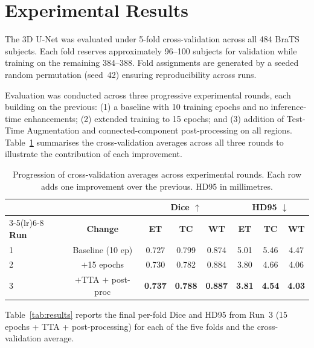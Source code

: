 \documentclass[10pt,twocolumn]{article}
\begin{document}
\section{Experimental Results}

The 3D U-Net was evaluated under 5-fold cross-validation across
all 484 BraTS subjects. Each fold reserves approximately 96--100
subjects for validation while training on the remaining 384--388.
Fold assignments are generated by a seeded random permutation
(seed~42) ensuring reproducibility across runs.

Evaluation was conducted across three progressive experimental
rounds, each building on the previous: (1) a baseline with 10
training epochs and no inference-time enhancements; (2) extended
training to 15 epochs; and (3) addition of Test-Time Augmentation
and connected-component post-processing on all regions.
Table~\ref{tab:progression} summarises the cross-validation
averages across all three rounds to illustrate the contribution
of each improvement.

\begin{table}[h]
\centering
\caption{Progression of cross-validation averages across
  experimental rounds. Each row adds one improvement over the
  previous. HD95 in millimetres.}
\label{tab:progression}
\small
\setlength{\tabcolsep}{3.5pt}
\begin{tabular}{lccccccc}
\toprule
 & & \multicolumn{3}{c}{\textbf{Dice $\uparrow$}} &
   \multicolumn{3}{c}{\textbf{HD95 $\downarrow$}} \\
\cmidrule(lr){3-5}\cmidrule(lr){6-8}
\textbf{Run} & \textbf{Change} & \textbf{ET} & \textbf{TC} & \textbf{WT} &
               \textbf{ET} & \textbf{TC} & \textbf{WT} \\
\midrule
1 & Baseline (10 ep) & 0.727 & 0.799 & 0.874 & 5.01 & 5.46 & 4.47 \\
2 & $+$15 epochs     & 0.730 & 0.782 & 0.884 & 3.80 & 4.66 & 4.06 \\
3 & $+$TTA $+$ post-proc & \textbf{0.737} & \textbf{0.788} & \textbf{0.887} & \textbf{3.81} & \textbf{4.54} & \textbf{4.03} \\
\bottomrule
\end{tabular}
\end{table}

Table~\ref{tab:results} reports the final per-fold Dice and HD95
from Run~3 (15 epochs + TTA + post-processing) for each of the
five folds and the cross-validation average.
\end{document}
